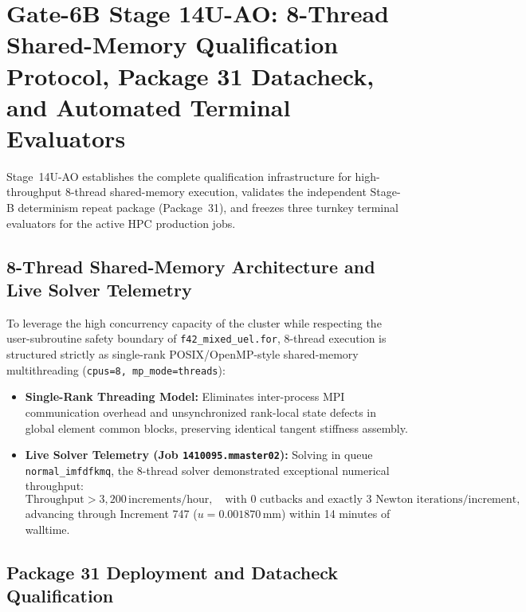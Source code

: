 \section{Gate-6B Stage 14U-AO: 8-Thread Shared-Memory Qualification Protocol, Package 31 Datacheck, and Automated Terminal Evaluators}
\label{sec:stage14uao_8thread_qualification_and_evaluators}

Stage~14U-AO establishes the complete qualification infrastructure for high-throughput 8-thread shared-memory execution, validates the independent Stage-B determinism repeat package (Package~31), and freezes three turnkey terminal evaluators for the active HPC production jobs.

\subsection{8-Thread Shared-Memory Architecture and Live Solver Telemetry}
\label{subsec:stage14uao_8thread_architecture}

To leverage the high concurrency capacity of the cluster while respecting the user-subroutine safety boundary of \texttt{f42\_mixed\_uel.for}, 8-thread execution is structured strictly as single-rank POSIX/OpenMP-style shared-memory multithreading (\texttt{cpus=8, mp\_mode=threads}):
\begin{itemize}
  \item \textbf{Single-Rank Threading Model:} Eliminates inter-process MPI communication overhead and unsynchronized rank-local state defects in global element common blocks, preserving identical tangent stiffness assembly.
  \item \textbf{Live Solver Telemetry (Job \texttt{1410095.mmaster02}):} Solving in queue \texttt{normal\_imfdfkmq}, the 8-thread solver demonstrated exceptional numerical throughput:
  \begin{equation}
    \text{Throughput} > 3{,}200\,\text{increments/hour}, \quad \text{with } 0 \text{ cutbacks and exactly } 3 \text{ Newton iterations/increment},
  \end{equation}
  advancing through Increment 747 ($u = 0.001870\,\mathrm{mm}$) within 14 minutes of walltime.
\end{itemize}

\subsection{Package 31 Deployment and Datacheck Qualification}
\label{subsec:stage14uao_pkg31_qualification}

